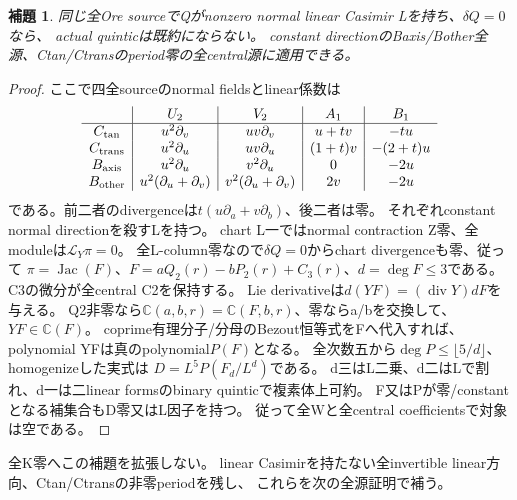 \documentclass[a4paper,11pt]{ltjsarticle}
\newtheorem{lemma}[proposition]{補題}
\theoremstyle{definition}
\begin{document}
\begin{lemma}\label{lem:plane-concurrent-m3-linear-casimir-empty}
同じ全Ore sourceでQがnonzero normal linear Casimir Lを持ち、$\delta Q=0$なら、
actual quinticは既約にならない。
constant directionのBaxis/Bother全源、Ctan/Ctransのperiod零の全central源に適用できる。
\end{lemma}
\begin{proof}
ここで四全sourceのnormal fieldsとlinear係数は
\[
\begin{array}{c|c|c|c|c}
 &U_2&V_2&A_1&B_1\\\hline
 C_{\rm tan}&u^2\partial_v&uv\partial_v&u+tv&-tu\\
 C_{\rm trans}&u^2\partial_u&uv\partial_u&(1+t)v&-(2+t)u\\
 B_{\rm axis}&u^2\partial_u&v^2\partial_u&0&-2u\\
 B_{\rm other}&u^2(\partial_u+\partial_v)&v^2(\partial_u+\partial_v)&2v&-2u
\end{array}
\]
である。前二者のdivergenceは$t(u\partial_a+v\partial_b)$、後二者は零。
それぞれconstant normal directionを殺すLを持つ。
chart L一ではnormal contraction Z零、全moduleは$\mathcal L_Y\pi=0$。
全L-column零なので$\delta Q=0$からchart divergenceも零、従って
$\pi=\operatorname{Jac}(F)$、$F=aQ_2(r)-bP_2(r)+C_3(r)$、$d=\deg F\le3$である。
C3の微分が全central C2を保持する。
Lie derivativeは$d(YF)=(\operatorname{div}Y)dF$を与える。
Q2非零なら$\mathbb C(a,b,r)=\mathbb C(F,b,r)$、零ならa/bを交換して、$YF\in\mathbb C(F)$。
coprime有理分子/分母のBezout恒等式をFへ代入すれば、polynomial YFは真のpolynomial$P(F)$となる。
全次数五から$\deg P\le\lfloor5/d\rfloor$、homogenizeした実式は
$D=L^5P(F_d/L^d)$である。
d三はL二乗、d二はLで割れ、d一は二linear formsのbinary quinticで複素体上可約。
F又はPが零/constantとなる補集合もD零又はL因子を持つ。
従って全Wと全central coefficientsで対象は空である。
\end{proof}
全K零へこの補題を拡張しない。
linear Casimirを持たない全invertible linear方向、Ctan/Ctransの非零periodを残し、
これらを次の全源証明で補う。
\end{document}
